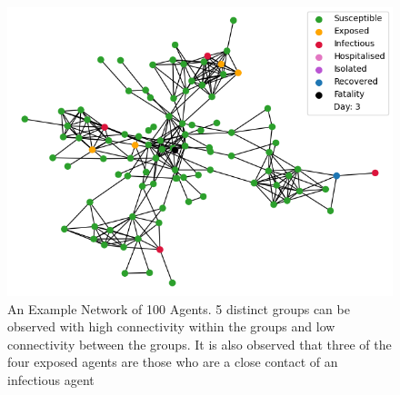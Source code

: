 \documentclass{article}
\begin{document}
\begin{figure}[h!]
\centering
\includegraphics[width=\textwidth]{network}
\caption{An Example Network of 100 Agents. 5 distinct groups can be observed with high connectivity within the groups and low connectivity between the groups. It is also observed that three of the four exposed agents are those who are a close contact of an infectious agent}
\end{figure}
\end{document}
